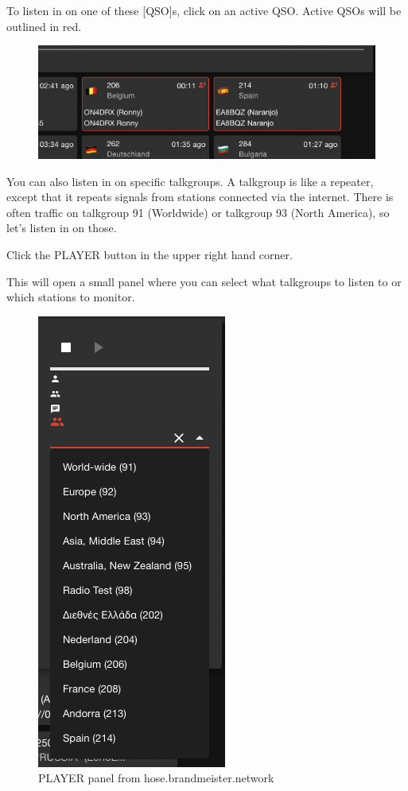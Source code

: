 \documentclass[
  letterpaper,
  DIV=11,
  numbers=noendperiod]{scrreport}
\begin{document}

To listen in on one of these {[}QSO{]}s, click on an active QSO. Active
QSOs will be outlined in {red}.

\begin{figure}

{\centering \includegraphics{include/img/brandmeister-network-active-qso.png}

}

\end{figure}

You can also listen in on specific talkgroups. A talkgroup is like a
repeater, except that it repeats signals from stations connected via the
internet. There is often traffic on talkgroup 91 (Worldwide) or
talkgroup 93 (North America), so let's listen in on those.

Click the PLAYER button in the upper right hand corner.

This will open a small panel where you can select what talkgroups to
listen to or which stations to monitor.

\begin{figure}

{\centering \includegraphics{include/img/brandmeister-hoseline-player-panel.png}

}

\caption{PLAYER panel from hose.brandmeister.network}

\end{figure}
\end{document}
